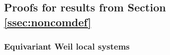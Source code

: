 \documentclass[10pt]{amsart}
\theoremstyle{plain}
\theoremstyle{definition}
\newcommand{\ab}{_{\operatorname{ab}}}
\begin{document}




\subsection{Proofs for results from Section \ref{ssec:noncomdef}} \label{ssec:proofs}

\subsubsection{Equivariant Weil local systems}\label{ssec:equivariant1}
\end{document}
